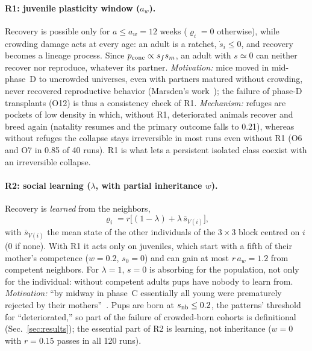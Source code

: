 \paragraph*{R1: juvenile plasticity window ($a_w$).}
Recovery is possible only for $a\le a_w=12$ weeks ($\varrho_i=0$ otherwise), while crowding damage acts at every age: an adult
is a ratchet, $\dot s_i\le0$, and recovery becomes a lineage process. Since $p_{\rm conc}\propto s_fs_m$, an adult with
$s\simeq0$ can neither recover nor reproduce, whatever its partner. \emph{Motivation:} mice moved in mid-phase~D to
uncrowded universes, even with partners matured without crowding, never recovered reproductive behavior (Marsden's
work~\cite{Calhoun1973,Marsden1972}); the failure of phase-D transplants (O12) is thus a
consistency check of R1. \emph{Mechanism:} refuges are pockets of low density in which, without R1, deteriorated
animals recover and breed again (natality resumes and the primary outcome falls to 0.21), whereas without refuges the
collapse stays irreversible in most runs even without R1 (O6 and O7 in 0.85 of 40 runs). R1 is what lets a persistent isolated class
coexist with an irreversible collapse.

\paragraph*{R2: social learning ($\lambda$, with partial inheritance $w$).}
Recovery is \emph{learned} from the neighbors,
\begin{equation}
  \varrho_i=r\bigl[(1-\lambda)+\lambda\,\bar s_{V(i)}\bigr],
  \label{eq:model-learning}
\end{equation}
with $\bar s_{V(i)}$ the mean state of the other individuals of the $3\times3$ block centred on $i$ (0 if none).
With R1 it acts only on juveniles, which start with a fifth of their mother's competence ($w=0.2$, $s_0=0$) and can
gain at most $r\,a_w=1.2$ from competent neighbors. For $\lambda=1$, $s=0$ is absorbing for the population, not only
for the individual: without competent adults pups have nobody to learn from.
\emph{Motivation:} ``by midway in phase~C essentially all young were prematurely rejected by their
mothers''~\cite{Calhoun1973}. Pups are born at $s_{\rm nb}\le0.2$, the patterns' threshold for ``deteriorated,'' so
part of the failure of crowded-born cohorts is definitional (Sec.~\ref{sec:results}); the essential part of R2 is
learning, not inheritance ($w=0$ with $r=0.15$ passes in all 120 runs).

